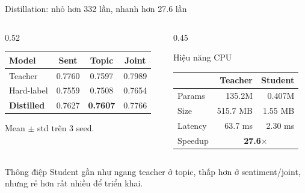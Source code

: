 \documentclass[aspectratio=169,11pt]{beamer}
\newcommand{\good}[1]{\textcolor{sgublue}{\textbf{#1}}}
\begin{document}
\begin{frame}{Distillation: nhỏ hơn 332 lần, nhanh hơn 27.6 lần}
\begin{columns}[T]
\begin{column}{0.52\textwidth}
\small
\begin{tabular}{@{}lccc@{}}
\toprule
Model & Sent & Topic & Joint \\
\midrule
Teacher & 0.7760 & 0.7597 & 0.7989 \\
Hard-label & 0.7559 & 0.7508 & 0.7654 \\
\good{Distilled} & 0.7627 & \good{0.7607} & 0.7766 \\
\bottomrule
\end{tabular}

\vspace{0.2cm}
{\scriptsize Mean $\pm$ std trên 3 seed.}
\end{column}
\begin{column}{0.45\textwidth}
\begin{block}{Hiệu năng CPU}
\begin{tabular}{@{}lrr@{}}
\toprule
 & Teacher & Student \\
\midrule
Params & 135.2M & 0.407M \\
Size & 515.7 MB & 1.55 MB \\
Latency & 63.7 ms & 2.30 ms \\
Speedup & \multicolumn{2}{c}{\good{27.6$\times$}} \\
\bottomrule
\end{tabular}
\end{block}
\end{column}
\end{columns}

\vspace{0.2cm}
\begin{block}{Thông điệp}
Student gần như ngang teacher ở topic, thấp hơn ở sentiment/joint, nhưng rẻ hơn rất nhiều để triển khai.
\end{block}
\end{frame}
\end{document}

